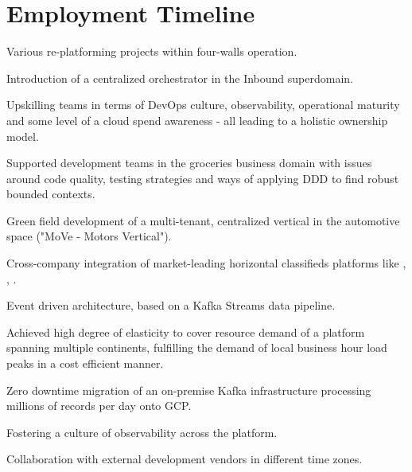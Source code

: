 \documentclass[]{resume}
\begin{document}
\begin{minipage}[t]{0.64\textwidth} 


\section{Employment Timeline}

\vspace{\topsep} %
\begin{tightemize}
\item Various re-platforming projects within four-walls operation.
\item Introduction of a centralized orchestrator in the Inbound superdomain.
\item Upskilling teams in terms of DevOps culture, observability, operational maturity and some level of a cloud spend awareness - all leading to a holistic ownership model.
\end{tightemize}
\sectionsep

\vspace{\topsep} %
Supported development teams in the groceries business domain with issues around code quality, testing strategies and ways of applying DDD to find robust bounded contexts.
\sectionsep

\vspace{\topsep} %
\begin{tightemize}
\item Green field development of a multi-tenant, centralized vertical in the automotive space ("MoVe - Motors Vertical").
\item Cross-company integration of market-leading horizontal classifieds platforms like \href{https://www.kijiji.ca}{}, \href{https://www.gumtree.com.au}{}, \href{https://www.gumtree.co.uk}{}.
\item Event driven architecture, based on a Kafka Streams data pipeline.
\item Achieved high degree of elasticity to cover resource demand of a platform spanning multiple continents, fulfilling the demand of local business hour load peaks in a cost efficient manner.
\item Zero downtime migration of an on-premise Kafka infrastructure processing millions of records per day onto GCP.
\item Fostering a culture of observability across the platform.
\item Collaboration with external development vendors in different time zones.
\end{tightemize}
\sectionsep


\end{minipage}
\end{document}
